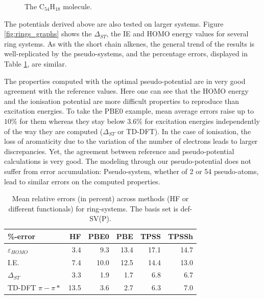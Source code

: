 \documentclass[aip]{revtex4-1}
\begin{document}
\begin{figure}
\begin{center}
\end{center}
\caption{\label{fig:c54h18}The C\(_{54}\)H\(_{18}\) molecule.}
\end{figure}

The potentials derived above are also tested on larger systems.
Figure \ref{fig:rings_graphs} shows the $\Delta_{ST}$, the IE and
HOMO energy values for several ring systems.
As with the short chain alkenes, the general trend of the results is well-replicated
by the pseudo-systems, and the percentage errors, displayed in Table
\ref{table:ring_system_errors}, are similar.

The properties computed with the optimal pseudo-potential are in very good
agreement with the reference values.
Here one can see that the HOMO energy and the ionisation potential
are more difficult properties to reproduce than excitation energies.
To take the PBE0 example, mean average errors raise up to $10\%$ for them
whereas they stay below $3.6\%$ for excitation energies independently of the way they are computed
($\Delta_{ST}$ or TD-DFT).
In the case of ionisation, the loss of aromaticity due to the variation of the number of
electrons leads to larger discrepancies.
Yet, the agreement between reference and pseudo-potential calculations is very good.
The modeling through our pseudo-potential does not suffer from error accumulation: Pseudo-system, whether of 2 or 54 pseudo-atoms, lead to similar errors on the computed properties.

\begin{table}[ht]
\caption{Mean relative errors (in percent) across methods (HF or different functionals)
for ring-systems.
The basis set is def-SV(P).}
\begin{tabular}{l r r r r r }
\hline\hline
\%-error                & HF & PBE0 & PBE & TPSS & TPSSh \\
\hline
$\varepsilon_{HOMO}$    & 3.4 &  9.3  & 13.4 & 17.1 & 14.7 \\
I.E.                    & 7.4 & 10.0  & 12.5 & 14.4 & 13.0 \\
$\Delta_{ST}$           & 3.3 &  1.9  &  1.7 &  6.8 &  6.7 \\
TD-DFT $\pi-\pi*$       & 13.5 &  3.6  &  2.7 &  6.3 &  7.0 \\ 
\hline\hline
\end{tabular}
\label{table:ring_system_errors}
\end{table}
\end{document}
